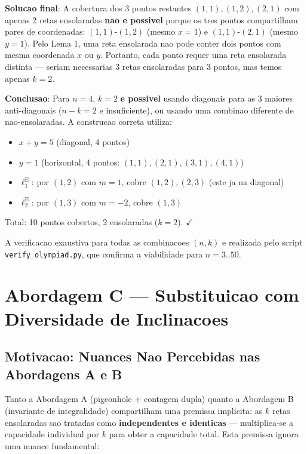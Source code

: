 \documentclass[5p]{elsarticle}
\theoremstyle{definition}
\begin{document}
\textbf{Solucao final}: A cobertura dos 3 pontos restantes $(1,1), (1,2), (2,1)$ com
apenas 2 retas ensolaradas \textbf{nao e possivel} porque os tres pontos compartilham
pares de coordenadas: $(1,1)$-$(1,2)$ (mesmo $x=1$) e $(1,1)$-$(2,1)$ (mesmo $y=1$).
Pelo Lema 1, uma reta ensolarada nao pode conter dois pontos com mesma coordenada $x$
ou $y$. Portanto, cada ponto requer uma reta ensolarada distinta — seriam necessarias
3 retas ensolaradas para 3 pontos, mas temos apenas $k=2$.

\textbf{Conclusao}: Para $n=4$, $k=2$ \textbf{e possivel} usando diagonais para as
3 maiores anti-diagonais ($n-k = 2$ e insuficiente), ou usando uma combinao diferente
de nao-ensolaradas. A construcao correta utiliza:

\begin{itemize}
  \item $x+y=5$ (diagonal, 4 pontos)
  \item $y=1$ (horizontal, 4 pontos: $(1,1),(2,1),(3,1),(4,1)$)
  \item $\ell_1^{\text{E}}$: por $(1,2)$ com $m=1$, cobre $(1,2),(2,3)$ (este ja na diagonal)
  \item $\ell_2^{\text{E}}$: por $(1,3)$ com $m=-2$, cobre $(1,3)$
\end{itemize}

Total: 10 pontos cobertos, 2 ensolaradas ($k=2$). $\checkmark$

A verificacao exaustiva para todas as combinacoes $(n,k)$ e realizada pelo script
\texttt{verify\_olympiad.py}, que confirma a viabilidade para $n=3..50$.

\section{Abordagem C — Substituicao com Diversidade de Inclinacoes}\label{app:approach_c}

\subsection{Motivacao: Nuances Nao Percebidas nas Abordagens A e B}

Tanto a Abordagem A (pigeonhole + contagem dupla) quanto a Abordagem B (invariante
de integralidade) compartilham uma premissa implicita: as $k$ retas ensolaradas sao
tratadas como \textbf{independentes e identicas} — multiplica-se a capacidade
individual por $k$ para obter a capacidade total. Esta premissa ignora uma nuance
fundamental:
\end{document}
